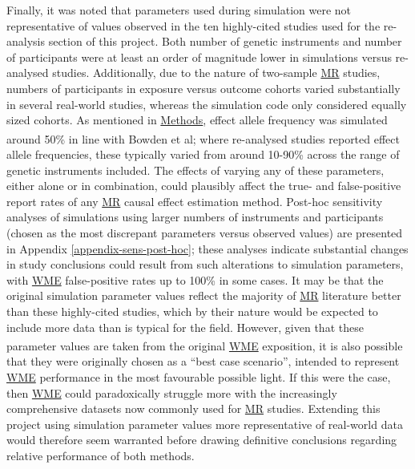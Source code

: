 \documentclass[
]{article}
\begin{document}
Finally, it was noted that parameters used during simulation were not representative of values observed in the ten highly-cited studies used for the re-analysis section of this project. Both number of genetic instruments and number of participants were at least an order of magnitude lower in simulations versus re-analysed studies. Additionally, due to the nature of two-sample \hyperref[acronyms_MR]{MR} studies, numbers of participants in exposure versus outcome cohorts varied substantially in several real-world studies, whereas the simulation code only considered equally sized cohorts. As mentioned in \hyperref[methods]{Methods}, effect allele frequency was simulated around 50\% in line with Bowden et al\textsuperscript{}; where re-analysed studies reported effect allele frequencies, these typically varied from around 10-90\% across the range of genetic instruments included. The effects of varying any of these parameters, either alone or in combination, could plausibly affect the true- and false-positive report rates of any \hyperref[acronyms_MR]{MR} causal effect estimation method. Post-hoc sensitivity analyses of simulations using larger numbers of instruments and participants (chosen as the most discrepant parameters versus observed values) are presented in Appendix \ref{appendix-sens-post-hoc}; these analyses indicate substantial changes in study conclusions could result from such alterations to simulation parameters, with \hyperref[acronyms_WME]{WME} false-positive rates up to 100\% in some cases. It may be that the original simulation parameter values reflect the majority of \hyperref[acronyms_MR]{MR} literature better than these highly-cited studies, which by their nature would be expected to include more data than is typical for the field. However, given that these parameter values are taken from the original \hyperref[acronyms_WME]{WME} exposition\textsuperscript{}, it is also possible that they were originally chosen as a ``best case scenario'', intended to represent \hyperref[acronyms_WME]{WME} performance in the most favourable possible light. If this were the case, then \hyperref[acronyms_WME]{WME} could paradoxically struggle more with the increasingly comprehensive datasets now commonly used for \hyperref[acronyms_MR]{MR} studies. Extending this project using simulation parameter values more representative of real-world data would therefore seem warranted before drawing definitive conclusions regarding relative performance of both methods.
\end{document}
